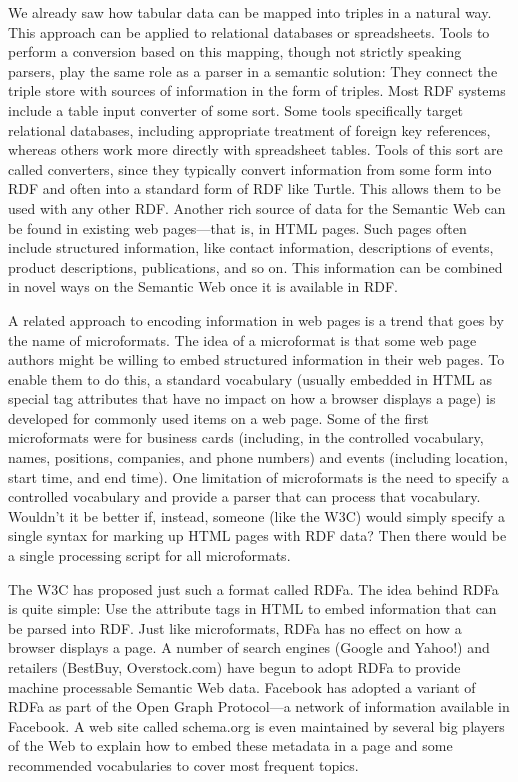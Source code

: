 We already saw how tabular data can be mapped into triples in a natural
way. This approach can be applied to relational databases or
spreadsheets. Tools to perform a conversion based on this mapping,
though not strictly speaking parsers, play the same role as a parser in
a semantic solution: They connect the triple store with sources of
information in the form of triples. Most RDF systems include a table
input converter of some sort. Some tools specifically target relational
databases, including appropriate treatment of foreign key references,
whereas others work more directly with spreadsheet tables. Tools of this
sort are called converters, since they typically convert information
from some form into RDF and often into a standard form of RDF like
Turtle. This allows them to be used with any other RDF. Another rich
source of data for the Semantic Web can be found in existing web
pages---that is, in HTML pages. Such pages often include structured
information, like contact information, descriptions of events, product
descriptions, publications, and so on. This information can be combined
in novel ways on the Semantic Web once it is available in RDF.

A related approach to encoding information in web pages is a trend that
goes by the name of microformats. The idea of a microformat is that some
web page authors might be willing to embed structured information in
their web pages. To enable them to do this, a standard vocabulary
(usually embedded in HTML as special tag attributes that have no impact
on how a browser displays a page) is developed for commonly used items
on a web page. Some of the first microformats were for business cards
(including, in the controlled vocabulary, names, positions, companies,
and phone numbers) and events (including location, start time, and end
time). One limitation of microformats is the need to specify a
controlled vocabulary and provide a parser that can process that
vocabulary. Wouldn't it be better if, instead, someone (like the W3C)
would simply specify a single syntax for marking up HTML pages with RDF
data? Then there would be a single processing script for all
microformats.

The W3C has proposed just such a format called RDFa. The idea behind
RDFa is quite simple: Use the attribute tags in HTML to embed
information that can be parsed into RDF. Just like microformats, RDFa
has no effect on how a browser displays a page. A number of search
engines (Google and Yahoo!) and retailers (BestBuy, Overstock.com) have
begun to adopt RDFa to provide machine processable Semantic Web data.
Facebook has adopted a variant of RDFa as part of the Open Graph
Protocol---a network of information available in Facebook. A web site
called schema.org is even maintained by several big players of the Web
to explain how to embed these metadata in a page and some recommended
vocabularies to cover most frequent topics.

